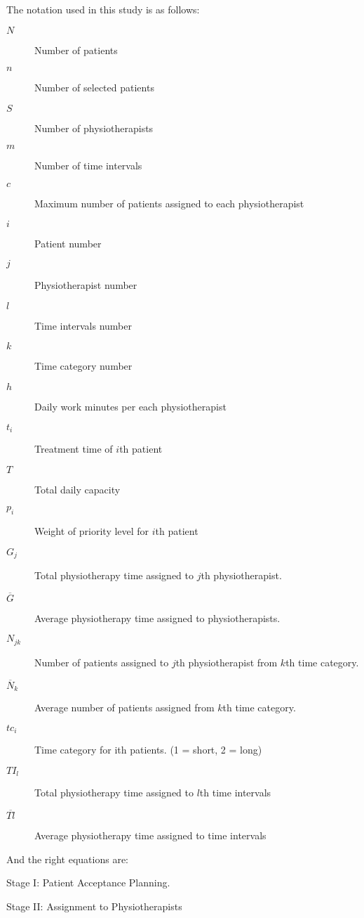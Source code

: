 \documentclass[a4paper,12pt]{article}
\begin{document}
The notation used in this study is as follows:
\begin{description}
	\item[$N$] Number of patients
	\item[$n$] Number of selected patients
	\item[$S$] Number of physiotherapists
	\item[$m$] Number of time intervals
	\item[$c$] Maximum number of patients assigned to each physiotherapist
	\item[$i$] Patient number
	\item[$j$] Physiotherapist number
	\item[$l$] Time intervals number
	\item[$k$] Time category number
	\item[$h$] Daily work minutes per each physiotherapist
	\item[$t_i$] Treatment time of $i$th patient
	\item[$T$] Total daily capacity
	\item[$p_i$] Weight of priority level for $i$th patient
	\item[$G_j$] Total physiotherapy time assigned to $j$th physiotherapist.
	\item[$\overline{G}$] Average physiotherapy time assigned to physiotherapists.
	\item[$N_{jk}$] Number of patients assigned to $j$th physiotherapist from $k$th time category.
	\item[$\overline{N}_k$] Average number of patients assigned from $k$th time category.
	\item[$tc_i$] Time category for ith patients. (1 = short, 2 = long)
	\item[$TI_l$] Total physiotherapy time assigned to $l$th time intervals
	\item[$\overline{Tl}$] Average physiotherapy time assigned to time intervals
\end{description}

And the right equations are:

Stage I: Patient Acceptance Planning.
\begin{lpformulation}
\end{lpformulation}


Stage II: Assignment to Physiotherapists
\end{document}
